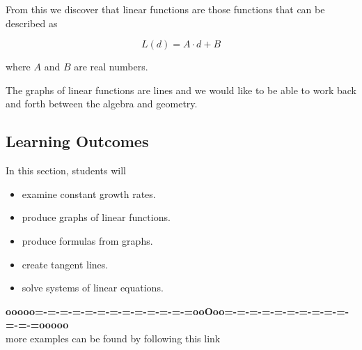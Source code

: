 \documentclass{ximera}
\begin{document}
From this we discover that linear functions are those functions that can be described as

\[  L(d) = A \cdot d + B \]

where $A$ and $B$ are real numbers.


The graphs of linear functions are lines and we would like to be able to work back and forth between the algebra and geometry.
















\subsection{Learning Outcomes}



\begin{sectionOutcomes}
In this section, students will 

\begin{itemize}
\item examine constant growth rates.
\item produce graphs of linear functions.
\item produce formulas from graphs.
\item create tangent lines.
\item solve systems of linear equations.
\end{itemize}
\end{sectionOutcomes}

















\begin{center}
\textbf{\textcolor{green!50!black}{ooooo=-=-=-=-=-=-=-=-=-=-=-=-=ooOoo=-=-=-=-=-=-=-=-=-=-=-=-=ooooo}} \\

more examples can be found by following this link\\ 

\end{center}
\end{document}
